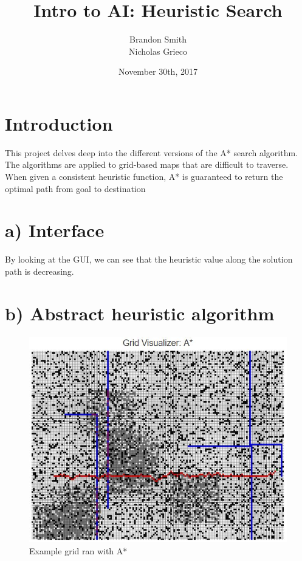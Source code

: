 \documentclass[a4paper]{article}
\title{Intro to AI: Heuristic Search}
\author{Brandon Smith \\ Nicholas Grieco}
\date{November 30th, 2017}
\begin{document}
\maketitle

\section*{Introduction}

This project delves deep into the different versions of the A* search algorithm. The algorithms are applied to grid-based maps that are difficult to traverse. When given a consistent heuristic function, A* is guaranteed to return the optimal path from goal to destination

\section*{a) Interface}
 
    By looking at the GUI, we can see that the heuristic value along the solution path is decreasing.

\section*{b) Abstract heuristic algorithm}

  \begin{figure}[!ht]
  \centering
  \includegraphics[width=150mm]{astar.JPG}
  \caption{\label{fig:Grid1}Example grid ran with A*}
  \end{figure}
  
\end{document}
